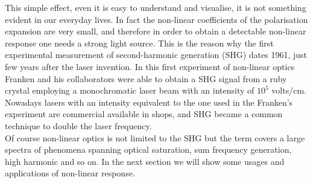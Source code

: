 This simple effect, even it is easy to understand and visualise, it is not something evident in our everyday lives. In fact the non-linear coefficients of the polarisation expansion are very small, and therefore in order to obtain a detectable non-linear response one needs a strong light source. This is the reason why the first experimental measurement of second-harmonic generation (SHG) dates 1961\cite{franken1961generation}, just few years after the laser invention.\cite{maiman1960stimulated} In this first experiment of non-linear optics Franken and his collaborators were able to obtain a SHG signal from a ruby crystal employing a monochromatic laser beam with an intensity of $10^5$ volts/cm.\\ %
Nowadays lasers with an intensity equivalent to the one used in the Franken's experiment are commercial available in shops, and SHG became a common technique to double the laser frequency.\\
Of course non-linear optics is not limited to the SHG but the term covers a large spectra of phenomena spanning optical saturation, sum frequency generation, high harmonic and so on. In the next section we will show some usages and applications of non-linear response.
